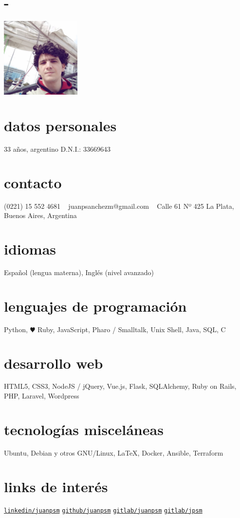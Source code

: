 \documentclass[espanol]{cv-style}     %
\begin{document}

\begin{aside}
\section{-}
\includegraphics[width=4cm]{22}
%
\section{datos personales}
33 años, argentino
D.N.I.: 33669643
%
\section{contacto}
(0221) 15 552 4681
~
juanpsanchezm@gmail.com
~
Calle 61 Nº 425
La Plata, Buenos Aires, Argentina
%
\section{idiomas}
Español (lengua materna),
Inglés (nivel avanzado)
%
\section{lenguajes de programación}
Python, {\color{red} $\varheartsuit$} Ruby, JavaScript, Pharo / Smalltalk, {Unix Shell}, Java, SQL, C
%
\section{desarrollo web}
HTML5, CSS3, NodeJS / jQuery, Vue.js, Flask, SQLAlchemy, Ruby on Rails, PHP, Laravel, Wordpress   
%
\section{tecnologías misceláneas}
Ubuntu, Debian y otros GNU/Linux, \LaTeX, Docker, Ansible, Terraform
%
\section{links de interés}
\href{https://www.linkedin.com/in/juanpsm/}{\texttt{linkedin/juanpsm}}
\href{https://github.com/juanpsm}{\texttt{github/juanpsm}}
\href{https://gitlab.com/juanpsm}{\texttt{gitlab/juanpsm}}
\href{https://gitlab.catedras.linti.unlp.edu.ar/jpsm}{\texttt{gitlab/jpsm}}
\end{aside}
\vspace{-0.1cm}
\end{document}
